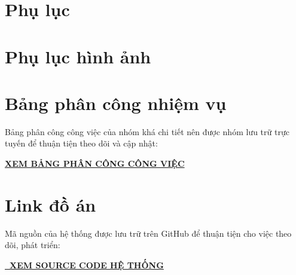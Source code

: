\documentclass[12pt,a4paper]{article}
\numberwithin{figure}{subsection}
\begin{document}
\section*{Phụ lục}

\newpage
\section*{Phụ lục hình ảnh}

\newpage
\section*{Bảng phân công nhiệm vụ}
Bảng phân công công việc của nhóm khá chi tiết nên được nhóm lưu trữ trực tuyến để thuận tiện theo dõi và cập nhật:

\begin{center}
\textbf{\Large
\href{https://docs.google.com/spreadsheets/d/1orHbU9IxSBTTOqu8nbCmwukOrbziY6j6/edit?gid=91630022\#gid=91630022}
{XEM BẢNG PHÂN CÔNG CÔNG VIỆC}
}
\end{center}

\hypersetup{
    colorlinks=true,
    urlcolor=blue
}

\section*{Link đồ án}
Mã nguồn của hệ thống được lưu trữ trên GitHub để thuận tiện cho việc theo dõi, phát triển:

\begin{center}
\textbf{\Large
\href{https://github.com/hoanganh-kevz/StudentManagement}
{\faGithub\ XEM SOURCE CODE HỆ THỐNG}
}
\end{center}
\end{document}
